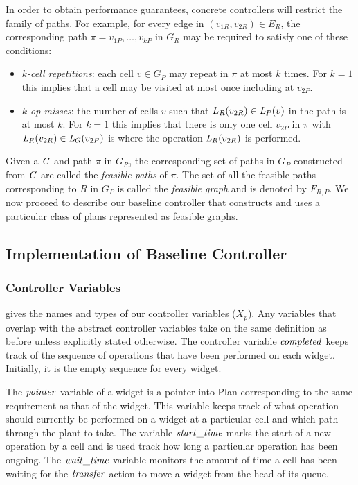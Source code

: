  
 In order to obtain performance guarantees, concrete controllers will restrict the family of paths. For example, for every edge in $(v_{1R},v_{2R}) \in E_R$, the corresponding path $\pi = v_{1P}, \ldots, v_{kP}$ in $G_R$ may be required to satisfy one of these conditions:
%
 \begin{itemize}
 	\item 	{\em $k$-cell repetitions\/}:  each cell $v \in G_P$ may repeat in $\pi$ at most $k$ times. For $k=1$ this implies that a cell may be visited at most once including at $v_{2P}$. 
 	\item {\em $k$-op misses\/}: the number of cells $v$ such that $L_R(v_{2R}) \in \mathit{L}_P(v)$ in the path is at most $k$. For $k=1$ this implies that there is only one cell $v_{2P}$ in $\pi$ with $\mathit{L}_R(v_{2R}) \in \mathit{L}_G(v_{2P})$ is where the operation $\mathit{L}_R(v_{2R})$ is performed. 
 	\end{itemize}
% 
Given a $\mathit{C}$ and path $\pi$ in $G_R$, the corresponding set of paths in $G_P$ constructed from $\mathit{C}$ are called the {\em feasible paths} of $\pi$.  The set of all the feasible paths corresponding to $R$ in $G_P$ is called the {\em feasible graph\/} and is denoted by $F_{R,P}$. 
We now proceed to describe our baseline controller that constructs and uses a particular class of plans
represented as feasible graphs. 
 
 
\subsection{Implementation of Baseline Controller}

\subsubsection*{Controller Variables}
 gives the names and types of our controller variables ($X_p$).
Any variables that overlap with the abstract controller variables take on the same definition as  before unless explicitly stated otherwise.
The controller variable $\mathit{completed}$ keeps track of the sequence of operations that have been performed on each widget. Initially, it is the empty sequence for every widget. 

The $\mathit{pointer}$ variable of a widget is a pointer into Plan  corresponding to the same requirement as that of the widget. This variable keeps track of what operation should currently be performed on a widget at a particular cell and which path through the plant to take.
The variable $\mathit{start\_time}$ marks the start of a new operation by a cell and is used track how long a particular operation has been ongoing. 
%
The $\mathit{wait\_time}$ variable monitors the amount of time a cell has been waiting for the $\mathit{transfer}$ action to move a widget from the head of its queue.

